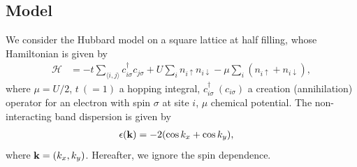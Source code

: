 \documentclass[submission, LectureNotes]{SciPost}
\newcommand{\bk}{\ensuremath{{\bf k}}}
\newcommand\ii{\mathrm{i}}%
\newcommand\iv{\ii\nu}%
\begin{document}
\subsection{Model}
We consider the Hubbard model on a square lattice at half filling,
whose Hamiltonian is given by
\begin{align}
    \mathcal{H} &= -t \sum_{\langle i, j\rangle}
        c^\dagger_{i\sigma} c_{j\sigma}
        + U \sum_i n_{i\uparrow} n_{i\downarrow}
        - \mu \sum_i (n_{i\uparrow} + n_{i\downarrow}),
\end{align}
where $\mu = U/2$, $t~(=1)$ a hopping integral,
$c^\dagger_{i\sigma}~(c_{i\sigma})$ a creation (annihilation) operator
for an electron with spin $\sigma$ at site $i$,
$\mu$ chemical potential.
The non-interacting band dispersion is given by
\begin{align}
    \epsilon(\bk) &= -2 (\cos{k_x} + \cos{k_y}),
\end{align}
where $\bk=(k_x, k_y)$.
Hereafter, we ignore the spin dependence.
%
%
%
%
\end{document}
